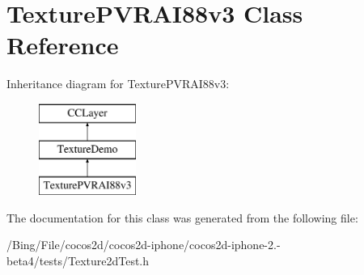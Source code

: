 \hypertarget{interface_texture_p_v_r_a_i88v3}{\section{Texture\-P\-V\-R\-A\-I88v3 Class Reference}
\label{interface_texture_p_v_r_a_i88v3}
}
Inheritance diagram for Texture\-P\-V\-R\-A\-I88v3\-:\begin{figure}[H]
\begin{center}
\leavevmode
\includegraphics[height=3.000000cm]{interface_texture_p_v_r_a_i88v3}
\end{center}
\end{figure}


The documentation for this class was generated from the following file\-:\begin{DoxyCompactItemize}
\item 
/\-Bing/\-File/cocos2d/cocos2d-\/iphone/cocos2d-\/iphone-\/2.-\/beta4/tests/Texture2d\-Test.\-h\end{DoxyCompactItemize}
